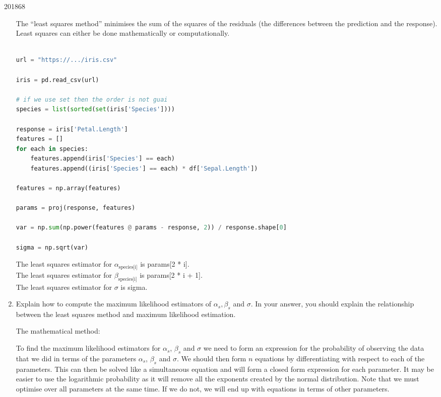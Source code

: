 \documentclass[10pt,\jkfside,a4paper]{article}
\begin{document}
\begin{examquestion}{2018}{6}{8}
\begin{enumerate}[label=(\alph*)]
The ``least squares method'' minimises the sum of the squares of the
residuals (the differences between the prediction and the response). Least
squares can either be done mathematically or computationally.

\begin{lstlisting}[language=Python]

url = "https://.../iris.csv"

iris = pd.read_csv(url)

# if we use set then the order is not guai
species = list(sorted(set(iris['Species'])))

response = iris['Petal.Length']
features = []
for each in species:
	features.append(iris['Species'] == each)
	features.append((iris['Species'] == each) * df['Sepal.Length'])

features = np.array(features)

params = proj(response, features)

var = np.sum(np.power(features @ params - response, 2)) / response.shape[0]

sigma = np.sqrt(var)

\end{lstlisting}

The least squares estimator for $\alpha_{\text{species[i]}}$ is params[2 * i].\\
The least squares estimator for $\beta_{\text{species[i]}}$ is params[2 * i + 1].\\
The least squares estimator for $\sigma$ is sigma.

\item Explain how to compute the maximum likelihood estimators of $\alpha_s,
\beta_s$ and $\sigma$. In your answer, you should explain the relationship
between the least squares method and maximum likelihood estimation.

The mathematical method:

To find the maximum likelihood estimators for $\alpha_s$, $\beta_s$ and
$\sigma$ we need to form an expression for the probability of observing the
data that we did in terms of the parameters $\alpha_s$, $\beta_s$ and
$\sigma$. We should then form $n$ equations by differentiating with respect
to each of the parameters. This can then be solved like a simultaneous
equation and will form a closed form expression for each parameter. It may
be easier to use the logarithmic probability as it will remove all the
exponents created by the normal distribution. Note that we must optimise
over all parameters at the same time. If we do not, we will end up with
equations in terms of other parameters.


\end{enumerate}
\end{examquestion}
\end{document}
